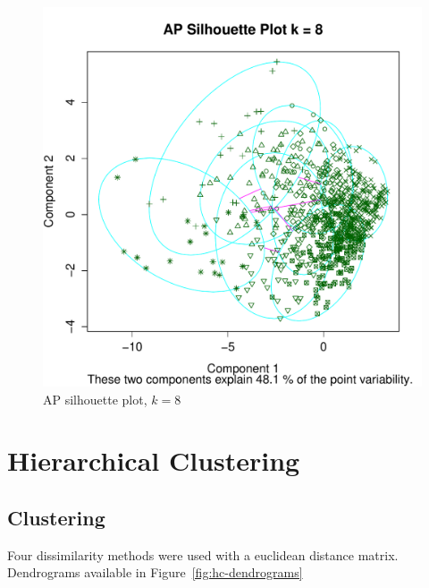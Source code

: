 \documentclass[letterpaper,12pt]{article}
\begin{document}
\begin{figure}[h]
  \centering
  \includegraphics[width=\linewidth]{ap-silhouette.pdf}
  \caption{AP silhouette plot, $k = 8$}
  \label{fig:ap-silhouette}
\end{figure}

\clearpage
\section{Hierarchical Clustering}

\subsection{Clustering}

Four dissimilarity methods were used with a euclidean distance matrix.
Dendrograms available in Figure~\ref{fig:hc-dendrograms}
\end{document}
